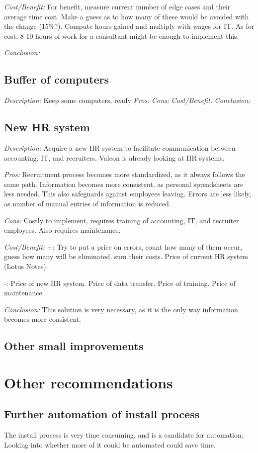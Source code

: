 \emph{Cost/Benefit:} For benefit, measure current number of edge cases and their average time cost.
Make a guess as to how many of these would be avoided with the change (15\%?).
Compute hours gained and multiply with wages for IT.
As for cost, 8-10 hours of work for a consultant might be enough to implement this.

\emph{Conclusion:} 

\subsection{Buffer of computers}
\emph{Description:} Keep some computers, ready 
\emph{Pros:}
\emph{Cons:}
\emph{Cost/Benefit:}
\emph{Conclusion:}

\subsection{New HR system}
\emph{Description:} Acquire a new HR system to facilitate communication between accounting, IT, and recruiters.
Valcon is already looking at HR systems.

\emph{Pros:} Recruitment process becomes more standardized, as it always follows the same path.
Information becomes more consistent, as personal spreadsheets are less needed. 
This also safeguards against employees leaving.
Errors are less likely, as number of manual entries of information is reduced.

\emph{Cons:} Costly to implement, requires training of accounting, IT, and recruiter employees.
Also requires maintenance.

\emph{Cost/Benefit:} +: Try to put a price on errors, count how many of them occur, guess how many will be eliminated, sum their costs.
Price of current HR system (Lotus Notes).

-: Price of new HR system.
Price of data transfer.
Price of training.
Price of maintenance.

\emph{Conclusion:} This solution is very necessary, as it is the only way information becomes more consistent.

\subsection{Other small improvements}

\section{Other recommendations}
\subsection{Further automation of install process}
The install process is very time consuming, and is a candidate for automation.
Looking into whether more of it could be automated could save time.